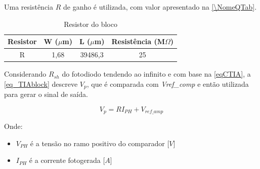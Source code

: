 Uma resist\^encia $R$ de ganho \'e utilizada, com valor apresentado na \autoref{\NomeQTab}.

\begin{table}[htb]
\caption{Resistor do bloco \NomeBloco}
\label{\NomeQTab}
\centering
\begin{tabular}{cccc}
\toprule
Resistor & W ($\mu$m)  & L ($\mu$m) & Resist\^encia (M$\Omega$)\\
\midrule \midrule
R & 1,68 & 39486,3 & 25\\
\bottomrule
\end{tabular}
\end{table}

Considerando $R_{sh}$ do fotodiodo tendendo ao infinito e com base na \autoref{eqCTIA}, a \autoref{eq_TIAblock} descreve $V_{p}$, que \'e comparada com \emph{Vref\_comp} e ent\~ao utilizada para gerar o sinal de sa\'ida.

\begin{equation}
    \label{eq_TIAblock}
    V_{p} = RI_{PH} + V_{ref\_amp}
\end{equation}

Onde:

\begin{itemize}

    \item \emph{$V_{PH}$} \'e a tens\~ao no ramo positivo do comparador [$V$]
    \item \emph{$I_{PH}$} \'e a corrente fotogerada [$A$]
    
\end{itemize}